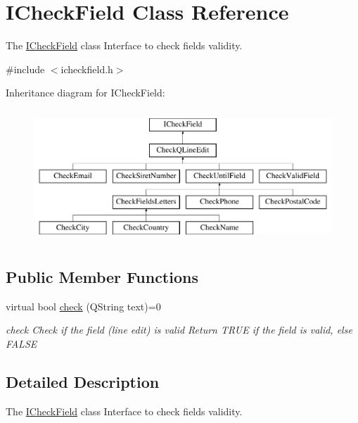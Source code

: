 \hypertarget{classICheckField}{\section{I\+Check\+Field Class Reference}
\label{classICheckField}
}


The \hyperlink{classICheckField}{I\+Check\+Field} class Interface to check fields validity.  




{\ttfamily \#include $<$icheckfield.\+h$>$}

Inheritance diagram for I\+Check\+Field\+:\begin{figure}[H]
\begin{center}
\leavevmode
\includegraphics[height=5.000000cm]{d5/d75/classICheckField}
\end{center}
\end{figure}
\subsection*{Public Member Functions}
\begin{DoxyCompactItemize}
\item 
virtual bool \hyperlink{classICheckField_a6bd42b4d49c165cdd92822135123fd4b}{check} (Q\+String text)=0
\begin{DoxyCompactList}\small\item\em check Check if the field (line edit) is valid Return T\+R\+U\+E if the field is valid, else F\+A\+L\+S\+E \end{DoxyCompactList}\end{DoxyCompactItemize}


\subsection{Detailed Description}
The \hyperlink{classICheckField}{I\+Check\+Field} class Interface to check fields validity. 


